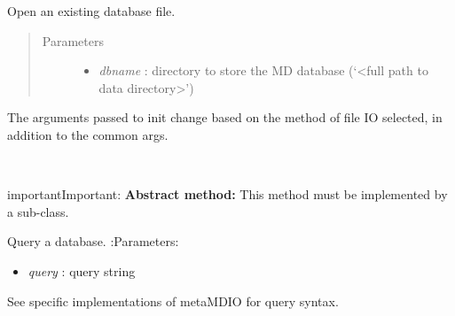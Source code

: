 \documentclass[letterpaper,10pt,english]{sphinxmanual}
\begin{document}
\begin{fulllineitems}
\begin{fulllineitems}
\begin{itemize}
\end{itemize}

\end{fulllineitems}


\begin{fulllineitems}
\label{api-doc/mosaic.meta:mosaic.metaMDIO.metaMDIO.openDB}
Open an existing database file.
\begin{quote}\begin{description}
\item[{Parameters}] \leavevmode\begin{itemize}
\item {} 
\emph{dbname} :            directory to store the MD database (`\textless{}full path to data directory\textgreater{}')

\end{itemize}

\end{description}\end{quote}




The arguments passed to init change based on the method of file IO selected, in addition to the common args.



\end{fulllineitems}


\begin{fulllineitems}
\label{api-doc/mosaic.meta:mosaic.metaMDIO.metaMDIO.queryDB}~
\begin{notice}{important}{Important:}
\textbf{Abstract method:} This method must be implemented by a sub-class.
\end{notice}

Query a database. 
:Parameters:
\begin{itemize}
\item {} 
\emph{query} : query string

\end{itemize}




See specific implementations of metaMDIO for query syntax.




\end{fulllineitems}
\end{fulllineitems}
\end{document}
